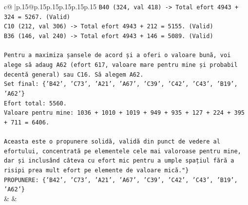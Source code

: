 \documentclass{article}
\begin{document}
{\begin{supertabular}{c@{$\;$}|p{.15\linewidth}@{}p{.15\linewidth}p{.15\linewidth}p{.15\linewidth}p{.15\linewidth}p{.15\linewidth}}
{{{\texttt{B40 (324, val 418) {-}> Total efort 4943 + 324 = 5267. (Valid)} \\
\texttt{C10 (212, val 306) {-}> Total efort 4943 + 212 = 5155. (Valid)} \\
\texttt{B36 (146, val 240) {-}> Total efort 4943 + 146 = 5089. (Valid)} \\
\\ 
\texttt{Pentru a maximiza șansele de acord și a oferi o valoare bună, voi alege să adaug A62 (efort 617, valoare mare pentru mine și probabil decentă general) sau C16. Să alegem A62.} \\
\texttt{Set final: \{'B42', 'C73', 'A21', 'A67', 'C39', 'C42', 'C43', 'B19', 'A62'\}} \\
\texttt{Efort total: 5560.} \\
\texttt{Valoare pentru mine: 1036 + 1010 + 1019 + 949 + 935 + 127 + 224 + 395 + 711 = 6406.} \\
\\ 
\texttt{Aceasta este o propunere solidă, validă din punct de vedere al efortului, concentrată pe elementele cele mai valoroase pentru mine, dar și inclusând câteva cu efort mic pentru a umple spațiul fără a risipi prea mult efort pe elemente de valoare mică."\}} \\
\texttt{PROPUNERE: \{'B42', 'C73', 'A21', 'A67', 'C39', 'C42', 'C43', 'B19', 'A62'\}} \\
            }
        }
    }
    & & \\ \\


\end{supertabular}}
\end{document}

